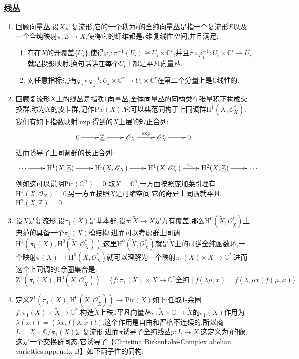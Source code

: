\subsubsection{线丛}
\begin{enumerate}
	\item 回顾向量丛.设$X$是复流形,它的一个秩为$r$的全纯向量丛是指一个复流形$E$以及一个全纯映射$\pi:E\to X$,使得它的纤维都是$r$维复线性空间,并且满足:
	\begin{enumerate}[(1)]
		\item 存在$X$的开覆盖$\{U_i\}$,使得$\varphi_i:\pi^{-1}(U_i)\cong U_i\times\mathbb{C}^r$,并且$\pi\circ\varphi_i^{-1}:U_i\times\mathbb{C}^r\to U_i$就是投影映射.换句话讲在每个$U_i$上都是平凡向量丛.
		\item 对任意指标$i,j$有$\varphi_i\circ\varphi_j^{-1}:U_j\times\mathbb{C}^r\to U_i\times\mathbb{C}^r$在第二个分量上是$\mathbb{C}$线性的.
	\end{enumerate}
	\item 回顾复流形$X$上的线丛是指秩1向量丛,全体向量丛的同构类在张量积下构成交换群,称为$X$的皮卡群,记作$\mathrm{Pic}(X)$.它可以典范同构于上同调群$\mathrm{H}^1(X,\mathscr{O}_X^*)$.我们有如下指数映射$\exp$得到的$X$上层的短正合列:
	$$\xymatrix{0\ar[r]&\underline{\mathbb{Z}}\ar[r]&\mathscr{O}_X\ar[r]^{\exp}&\mathscr{O}_X^*\ar[r]&0}$$
	进而诱导了上同调群的长正合列:
	$$\xymatrix{\cdots\ar[r]&\mathrm{H}^1(X,\underline{\mathbb{Z}})\ar[r]&\mathrm{H}^1(X,\mathscr{O}_X)\ar[r]&\mathrm{H}^1(X,\mathscr{O}_X^*)\ar[r]^{c_1}&\mathrm{H}^2(X,\underline{\mathbb{Z}})\ar[r]&\cdots}$$
	例如这可以说明$\mathrm{Pic}(\mathbb{C}^n)=0$:取$X=\mathbb{C}^n$,一方面按照庞加莱引理有$\mathrm{H}^1(X,\mathscr{O}_X)=0$,另一方面按照$X$是可缩空间,它的奇异上同调就平凡$\mathrm{H}^2(X,\mathbb{Z})=0$.
	\item 设$X$是复流形,设$\pi_1(X)$是基本群,设$\pi:\widetilde{X}\to X$是万有覆盖,那么$\mathrm{H}^0(\widetilde{X},\mathscr{O}_{\widetilde{X}}^*)$上典范的具备一个$\pi_1(X)$模结构.进而可以考虑群上同调$\mathrm{H}^1(\pi_1(X),\mathrm{H}^0(\widetilde{X},\mathscr{O}_{\widetilde{X}}^*))$,这里$\mathrm{H}^0(\widetilde{X},\mathscr{O}_{\widetilde{X}}^*)$就是$\widetilde{X}$上的可逆全纯函数环,一个映射$\pi(X)\to\mathrm{H}^0(\widetilde{X},\mathscr{O}_{\widetilde{X}}^*)$就可以理解为一个映射$\pi_1(X)\times\widetilde{X}\to\mathbb{C}^*$.进而这个上同调的1余圈集合是:$$\mathrm{Z}^1(\pi_1(X),\mathrm{H}^0(\widetilde{X},\mathscr{O}_{\widetilde{X}}^*))=\{f:\pi_1(X)\times\widetilde{X}\to\mathbb{C}^*\text{全纯}\mid f(\lambda\mu,\widetilde{x})=f(\lambda,\mu\widetilde{x})f(\mu,\widetilde{x})\}$$
	\item 定义$\mathrm{Z}^1(\pi_1(X),\mathrm{H}^0(\widetilde{X},\mathscr{O}_{\widetilde{X}}^*))\to\mathrm{Pic}(X)$如下:任取1-余圈$f:\pi_1(X)\times\widetilde{X}\to\mathbb{C}^*$,构造$\widetilde{X}$上秩1平凡向量丛$\pi:\widetilde{X}\times\mathbb{C}\to\widetilde{X}$的$\pi_1(X)$作用为$\lambda(\widetilde{x},t)=(\lambda\widetilde{x},f(\lambda,\widetilde{x})t)$.这个作用是自由和严格不连续的,所以商$L=\widetilde{X}\times\mathbb{C}/\pi_1(X)$是复流形.进而$\pi$诱导了全纯线丛$p:L\to X$.这定义为$f$的像,这是一个交换群同态,它诱导了【Christina Birkenhake-Complex abelian varietties,appendix B】如下函子性的同构:

\end{enumerate}
